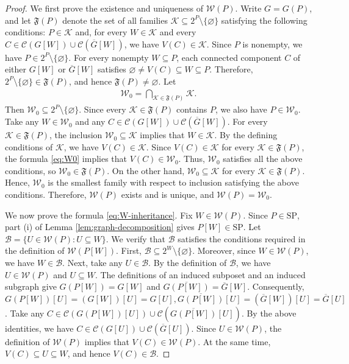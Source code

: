 \documentclass[11pt,a4paper]{article}
\begin{document}
\begin{proof}
We first prove the existence and uniqueness of $\mathcal W(P)$.
Write $G=G(P)$, and let $\mathfrak F(P)$ denote the set
of all families $\mathcal K\subseteq 2^P\setminus\{\varnothing\}$
satisfying the following conditions:
$P\in\mathcal K$ and, for every $W\in\mathcal K$ and every
$C\in\mathcal C(G[W])\cup\mathcal C(\overline G[W])$, we have $V(C)\in\mathcal K$.
Since $P$ is nonempty, we have $P\in 2^P\setminus\{\varnothing\}$.
For every nonempty $W\subseteq P$, each connected component $C$
of either $G[W]$ or $\overline G[W]$ satisfies $\varnothing\neq V(C)\subseteq W\subseteq P$.
Therefore, $2^P\setminus\{\varnothing\}\in\mathfrak F(P)$,
and hence $\mathfrak F(P)\neq\varnothing$. Let
\begin{eqnarray}\label{eq:W0}
\mathcal W_0=\bigcap_{\mathcal K\in\mathfrak F(P)}\mathcal K.
\end{eqnarray}
Then $\mathcal W_0\subseteq 2^P\setminus\{\varnothing\}$.
Since every $\mathcal K\in\mathfrak F(P)$ contains $P$,
we also have $P\in\mathcal W_0$.
Take any $W\in\mathcal W_0$ and any $C\in\mathcal C(G[W])\cup\mathcal C(\overline G[W])$.
For every $\mathcal K\in\mathfrak F(P)$,
the inclusion $\mathcal W_0\subseteq\mathcal K$ implies that $W\in\mathcal K$.
By the defining conditions of $\mathcal K$, we have $V(C)\in\mathcal K$.
Since $V(C)\in\mathcal K$ for every
$\mathcal K\in\mathfrak F(P)$, the formula \eqref{eq:W0}
implies that $V(C)\in\mathcal W_0$.
Thus, $\mathcal W_0$ satisfies all the above conditions, so $\mathcal W_0\in\mathfrak F(P)$.
On the other hand, $\mathcal W_0\subseteq\mathcal K$ for every $\mathcal K\in\mathfrak F(P)$.
Hence, $\mathcal W_0$ is the smallest family with respect to inclusion satisfying the above conditions.
Therefore, $\mathcal W(P)$ exists and is unique, and $\mathcal W(P)=\mathcal W_0$.

We now prove the formula \eqref{eq:W-inheritance}.
Fix $W\in\mathcal W(P)$.
Since $P\in\mathrm{SP}$,
part \textup{(i)} of Lemma \ref{lem:graph-decomposition}
gives $P[W]\in\mathrm{SP}$.
Let $\mathcal B=\{U\in\mathcal W(P):U\subseteq W\}$.
We verify that $\mathcal B$ satisfies the conditions required
in the definition of $\mathcal W(P[W])$.
First, $\mathcal B\subseteq 2^W\setminus\{\varnothing\}$.
Moreover, since $W\in\mathcal W(P)$, we have $W\in\mathcal B$.
Next, take any $U\in\mathcal B$.
By the definition of $\mathcal B$, we have $U\in\mathcal W(P)$ and $U\subseteq W$.
The definitions of an induced subposet and an induced subgraph give
$G(P[W])=G[W]$ and $\overline{G(P[W])}=\overline G[W]$.
Consequently, $G(P[W])[U]=(G[W])[U]=G[U],\overline{G(P[W])}[U]=(\overline G[W])[U]=\overline G[U]$.
Take any $C\in\mathcal C(G(P[W])[U])\cup\mathcal C(\overline{G(P[W])}[U])$.
By the above identities, we have $C\in\mathcal C(G[U])\cup\mathcal C(\overline G[U])$.
Since $U\in\mathcal W(P)$, the definition of $\mathcal W(P)$ implies that $V(C)\in\mathcal W(P)$.
At the same time, $V(C)\subseteq U\subseteq W$, and hence $V(C)\in\mathcal B$.


\end{proof}
\end{document}
